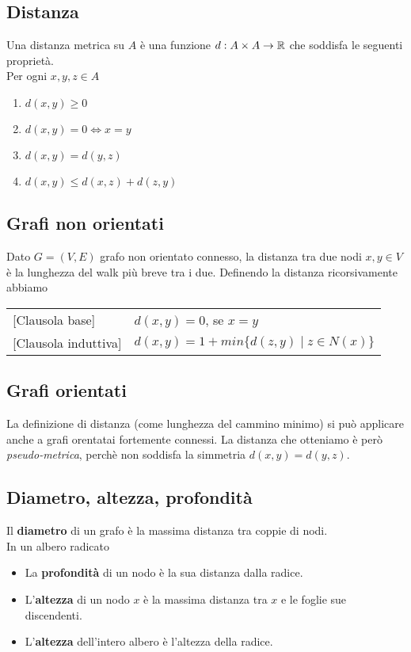 \documentclass{article}
\begin{document}
\subsection{Distanza}
Una distanza metrica su \(A\) è una funzione \(d: A \times A \rightarrow \mathbb{R}\) che soddisfa le seguenti proprietà. \\
Per ogni \(x,y,z \in A\)
\begin{enumerate}
    \item \(d(x,y) \geq 0\)
    \item \(d(x,y) = 0 \iff x = y\)
    \item \(d(x,y) = d(y,z)\)
    \item \(d(x,y) \leq d(x,z) + d(z,y)\)
\end{enumerate}
\subsection*{Grafi non orientati}
Dato \(G = (V,E)\) grafo non orientato connesso, la distanza tra due nodi \(x,y \in V\) è la lunghezza del walk più breve tra i due. Definendo la distanza ricorsivamente abbiamo
\begin{center}
    \begin{tabular}{ll}
        {[Clausola base]}      & \(d(x,y) = 0\), se \(x = y\)                   \\
        {[Clausola induttiva]} & \(d(x,y) = 1 + min\{d(z,y) \mid z \in N(x)\}\)
    \end{tabular}
\end{center}
\subsection*{Grafi orientati}
La definizione di distanza (come lunghezza del cammino minimo) si può applicare anche a grafi orentatai fortemente connessi.
La distanza che otteniamo è però \emph{pseudo-metrica}, perchè non soddisfa la simmetria \(d(x,y) = d(y,z)\).
\subsection*{Diametro, altezza, profondità}
Il \textbf{diametro} di un grafo è la massima distanza tra coppie di nodi. \\
In un albero radicato
\begin{itemize}
    \item La \textbf{profondità} di un nodo è la sua distanza dalla radice.
    \item L'\textbf{altezza} di un nodo \(x\) è la massima distanza tra \(x\) e le foglie sue discendenti.
    \item L'\textbf{altezza} dell'intero albero è l'altezza della radice.
\end{itemize}
\end{document}
